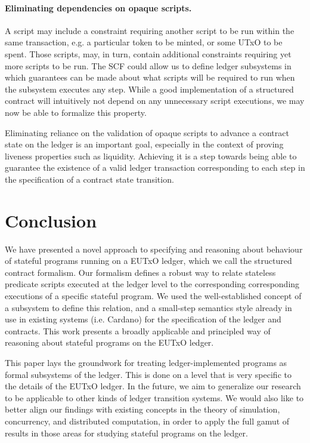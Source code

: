 \paragraph{Eliminating dependencies on opaque scripts. }
A script may include a constraint requiring another script to be run
within the same transaction, e.g. a particular token to be minted,
or some UTxO to be spent. Those scripts, may, in turn, contain additional
constraints requiring yet more scripts to be run. The SCF could allow us to
define ledger subsystems in which guarantees can be made about what scripts
will be required to run when the subsystem executes any step. While a good
implementation of a structured contract will intuitively not depend on any unnecessary
script executions, we may now be able to formalize this property.

Eliminating reliance on the validation of opaque scripts to advance a contract
state on the ledger is an important goal, especially in the context of proving
liveness properties such as liquidity. Achieving it is a step towards being
able to guarantee the existence of a valid ledger transaction corresponding to
each step in the specification of a contract state transition.


\section{Conclusion}
\label{sec:conclusion}

We have presented a novel approach to specifying and reasoning about behaviour of
stateful programs running on a EUTxO ledger, which we call the structured contract
formalism. Our formalism defines a robust
way to relate stateless predicate scripts executed at the ledger level to the
corresponding corresponding executions of a specific stateful program.
We used the well-established concept of a subsystem
to define this relation, and a small-step semantics style already in use in
existing systems (i.e. Cardano) for the specification of the ledger and contracts.
This work presents a broadly applicable and principled
way of reasoning about stateful programs on the EUTxO ledger.

This paper lays the groundwork for treating ledger-implemented programs as
formal subsystems of the ledger. This is done on a level that is very specific
to the details of the EUTxO ledger. In the future, we aim to generalize our
research to be applicable to other kinds of ledger transition systems.
We would also like to better align our findings with existing concepts in the
theory of simulation, concurrency, and distributed computation, in order to
apply the full gamut of results in those areas for studying stateful
programs on the ledger.

